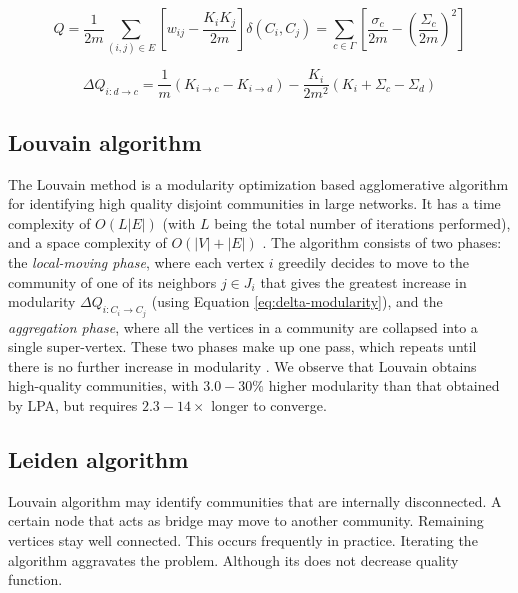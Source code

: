 \begin{equation}
\label{eq:modularity}
  Q
  = \frac{1}{2m} \sum_{(i, j) \in E} \left[w_{ij} - \frac{K_i K_j}{2m}\right] \delta(C_i, C_j)
  = \sum_{c \in \Gamma} \left[\frac{\sigma_c}{2m} - \left(\frac{\Sigma_c}{2m}\right)^2\right]
\end{equation}

\begin{equation}
\label{eq:delta-modularity}
  \Delta Q_{i: d \rightarrow c}
  = \frac{1}{m} (K_{i \rightarrow c} - K_{i \rightarrow d}) - \frac{K_i}{2m^2} (K_i + \Sigma_c - \Sigma_d)
\end{equation}




\subsection{Louvain algorithm}
\label{sec:about-leiden}

The Louvain method \cite{com-blondel08} is a modularity optimization based agglomerative algorithm for identifying high quality disjoint communities in large networks. It has a time complexity of $O (L |E|)$ (with $L$ being the total number of iterations performed), and a space complexity of $O(|V| + |E|)$ \cite{com-lancichinetti09}. The algorithm consists of two phases: the \textit{local-moving phase}, where each vertex $i$ greedily decides to move to the community of one of its neighbors $j \in J_i$ that gives the greatest increase in modularity $\Delta Q_{i:C_i \rightarrow C_j}$ (using Equation \ref{eq:delta-modularity}), and the \textit{aggregation phase}, where all the vertices in a community are collapsed into a single super-vertex. These two phases make up one pass, which repeats until there is no further increase in modularity \cite{com-blondel08, com-leskovec21}. We observe that Louvain obtains high-quality communities, with $3.0 - 30\%$ higher modularity than that obtained by LPA, but requires $2.3 - 14\times$ longer to converge.




\subsection{Leiden algorithm}
\label{sec:about-leiden}

Louvain algorithm may identify communities that are internally disconnected. A certain node that acts as bridge may move to another community. Remaining vertices stay well connected. This occurs frequently in practice. Iterating the algorithm aggravates the problem. Although its does not decrease quality function.


